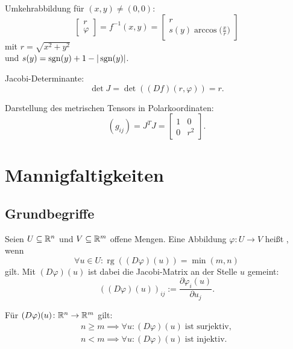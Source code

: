 Umkehrabbildung für $(x,y)\ne (0,0)$:
\begin{equation}
\begin{bmatrix}r\\ \varphi\end{bmatrix}
= f^{-1}(x,y)
= \begin{bmatrix}
r\\
\displaystyle s(y)\arccos\Big(\frac{x}{r}\Big)
\end{bmatrix}
\end{equation}
mit $r=\sqrt{x^2+y^2}$\\
und $s(y)=\operatorname*{sgn}(y)+1-|\operatorname*{sgn}(y)|$.

Jacobi-Determinante:
\begin{equation}
\det J = \det((Df)(r,\varphi)) =r.
\end{equation}

\pagebreak[3]\noindent
Darstellung des metrischen Tensors in Polarkoordinaten:%
\begin{equation}
(g_{ij}) = J^T J = \begin{bmatrix}
1 & 0\\
0 & r^2
\end{bmatrix}.
\end{equation}

\section{Mannigfaltigkeiten}
\subsection{Grundbegriffe}

\begin{definition}
Seien $U\subseteq\mathbb R^n$ und $V\subseteq\mathbb R^m$ offene Mengen.
Eine Abbildung $\varphi\colon U\to V$
heißt , wenn%
\begin{equation}
\forall u\in U\colon \operatorname{rg}((D\varphi)(u))=\min(m,n)
\end{equation}
gilt. Mit $(D\varphi)(u)$ ist dabei die Jacobi-Matrix an der Stelle
$u$ gemeint:
\begin{equation}
((D\varphi)(u))_{ij} := \frac{\partial\varphi_i(u)}{\partial u_j}.
\end{equation}
\end{definition}
\noindent
Für $(D\varphi)(u)\colon\mathbb R^n\to\mathbb R^m$ gilt:
\begin{gather}
n{\ge}m\implies\forall u\colon (D\varphi)(u)\;\text{ist surjektiv},\\
n{<}m\implies\forall u\colon (D\varphi)(u)\;\text{ist injektiv}.
\end{gather}

